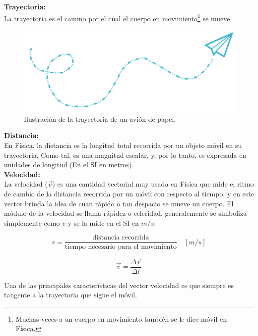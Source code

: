 \documentclass[a5paper,pagesize,10pt,bibtotoc,pointlessnumbers,
normalheadings,DIV=9,fleqn,x11names,table,twoside=false]{scrbook}
\begin{document}
\textbf{Trayectoria:}\\

La trayectoria es el camino por el cual el cuerpo en movimiento\footnote{Muchas veces a un cuerpo en movimiento también se le 
dice móvil en Física.} se mueve.

\begin{figure}[ht]
 \centering
 \includegraphics[scale=0.4]{images/trayectoria.png}
 \caption{Ilustración de la trayectoria de un avión de papel.}
\end{figure}

\textbf{Distancia:}\\

En Física, la distancia es la longitud total recorrida por un objeto móvil en su trayectoria. Como tal, es una magnitud escalar, 
y, por lo tanto, es expresada en unidades de longitud (En el SI en metros).\\

\textbf{Velocidad:}\\

La velocidad ($\vec{v}$) es una cantidad vectorial muy usada en Física que mide el ritmo de cambio de la distancia recorrida por 
un móvil con respecto al tiempo, y en este vector brinda la idea de cuan rápido o tan despacio se mueve un cuerpo. El módulo de 
la velocidad se llama rápidez o celeridad, generalemente se simboliza simplemente como $v$ y se la mide en el SI en $m/s$. 

\begin{equation}
 v = \frac{\text{distancia recorrida}}{\text{tiempo necesario para el movimiento}} \quad [m/s]
\end{equation}

\begin{equation}
 \vec{v} = \frac{\Delta \vec{r}}{\Delta t}
\end{equation}

Una de las principales características del vector velocidad es que siempre es tangente a la trayectoria que sigue el móvil.
\end{document}
